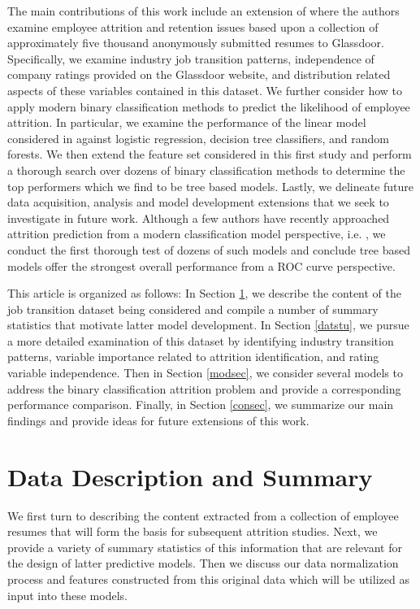 \documentclass[10pt]{article}
\begin{document}
The main contributions of this work include an extension of \cite{Smart2016} where the authors 
examine employee 
attrition and retention issues based upon 
a collection of approximately five thousand anonymously submitted resumes to Glassdoor.  
Specifically, we examine industry job transition patterns, independence of company ratings 
provided on the Glassdoor website, and distribution related aspects of these variables 
contained in this dataset.  We further consider how to apply modern binary classification 
methods to predict the likelihood of employee attrition.  In particular, we examine the 
performance of the linear model considered in \cite{Smart2016} against logistic regression, 
decision tree classifiers, and random forests.  We then extend the feature set considered in this 
first study 
and perform a thorough search over dozens of binary classification methods to determine 
the top performers which we find to be tree based models.
 Lastly, we delineate 
future data acquisition, analysis and model development extensions that we seek to investigate 
in future work. Although a few authors have recently approached attrition prediction 
from a modern classification model perspective, i.e. \cite{Alao2013,Fri2018, Naga}, we conduct the first 
thorough test of dozens of such models and conclude tree based models offer the strongest 
overall performance from a ROC curve perspective.

This article is organized as follows: In Section \ref{datsec}, we describe the content 
of the job transition dataset being considered and compile a number of 
summary statistics that motivate latter model development.  In Section \ref{datstu},
we pursue a more detailed examination of this dataset by identifying industry transition 
patterns, variable importance related to attrition identification, and 
rating variable independence.  Then in Section \ref{modsec}, we consider several 
models to address the binary classification attrition problem and provide a 
corresponding performance comparison.  Finally, in Section \ref{consec}, we 
summarize our main findings and provide ideas for future extensions of this work.

\section{Data Description and Summary} \label{datsec}

We first turn to describing the content extracted from a collection of 
employee resumes that will form the basis for subsequent attrition studies. 
Next, we provide a variety of summary statistics of this information that 
are relevant for the design of latter predictive models.  Then we discuss 
our data normalization process and 
features constructed from this original data which will be utilized 
as input into these models.
\end{document}
